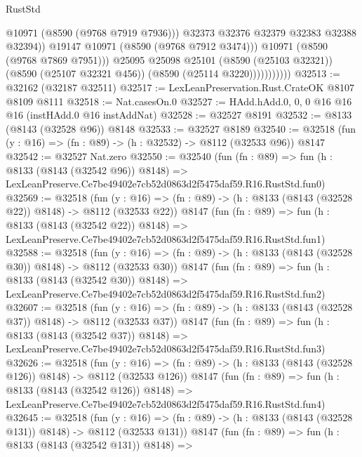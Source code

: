 \begin{lexlean}{RustStd}
\begin{coremodule}
                                @10971
                                (@8590 (@9768 @7919 @7936)))
                              @32373
                              @32376
                              @32379
                              @32383
                              @32388
                              @32394))
                          @19147
                          @10971
                          (@8590 (@9768 @7912 @3474)))
                        @10971
                        (@8590 (@9768 @7869 @7951)))
                      @25095
                      @25098
                      @25101
                      (@8590 (@25103 @32321))
                      (@8590 (@25107 @32321 @456))
                      (@8590 (@25114 @3220)))))))))))
@32513 := @32162 (@32187 @32511)
@32517 := LexLeanPreservation.Rust.CrateOK @8107 @8109 @8111
@32518 := Nat.casesOn.{0}
@32527 := HAdd.hAdd.{0, 0, 0} @16 @16 @16 (instHAdd.{0} @16 instAddNat)
@32528 := @32527 @8191
@32532 := @8133 (@8143 (@32528 @96)) @8148
@32533 := @32527 @8189
@32540 := @32518 (fun (y : @16) => (fn : @89) -> (h : @32532) -> @8112 (@32533 @96)) @8147
@32542 := @32527 Nat.zero
@32550 := @32540
    (fun (fn : @89) =>
    fun (h : @8133 (@8143 (@32542 @96)) @8148) =>
    LexLeanPreserve.Ce7be49402e7cb52d0863d2f5475daf59.R16.RustStd.fun0)
@32569 := @32518
    (fun (y : @16) => (fn : @89) -> (h : @8133 (@8143 (@32528 @22)) @8148) -> @8112 (@32533 @22))
    @8147
    (fun (fn : @89) =>
    fun (h : @8133 (@8143 (@32542 @22)) @8148) =>
    LexLeanPreserve.Ce7be49402e7cb52d0863d2f5475daf59.R16.RustStd.fun1)
@32588 := @32518
    (fun (y : @16) => (fn : @89) -> (h : @8133 (@8143 (@32528 @30)) @8148) -> @8112 (@32533 @30))
    @8147
    (fun (fn : @89) =>
    fun (h : @8133 (@8143 (@32542 @30)) @8148) =>
    LexLeanPreserve.Ce7be49402e7cb52d0863d2f5475daf59.R16.RustStd.fun2)
@32607 := @32518
    (fun (y : @16) => (fn : @89) -> (h : @8133 (@8143 (@32528 @37)) @8148) -> @8112 (@32533 @37))
    @8147
    (fun (fn : @89) =>
    fun (h : @8133 (@8143 (@32542 @37)) @8148) =>
    LexLeanPreserve.Ce7be49402e7cb52d0863d2f5475daf59.R16.RustStd.fun3)
@32626 := @32518
    (fun (y : @16) => (fn : @89) -> (h : @8133 (@8143 (@32528 @126)) @8148) -> @8112 (@32533 @126))
    @8147
    (fun (fn : @89) =>
    fun (h : @8133 (@8143 (@32542 @126)) @8148) =>
    LexLeanPreserve.Ce7be49402e7cb52d0863d2f5475daf59.R16.RustStd.fun4)
@32645 := @32518
    (fun (y : @16) => (fn : @89) -> (h : @8133 (@8143 (@32528 @131)) @8148) -> @8112 (@32533 @131))
    @8147
    (fun (fn : @89) =>
    fun (h : @8133 (@8143 (@32542 @131)) @8148) =>

\end{coremodule}
\end{lexlean}
